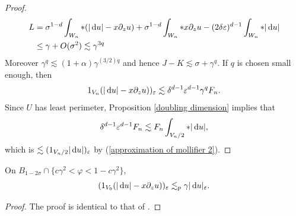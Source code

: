 \begin{proof}
\begin{align*}
L &= \sigma^{1 - d} \int_{W_n} *(|\mathop{}\!\mathrm{d} u| - x\partial_z u) + \sigma^{1 - d} \int_{W_n} *x\partial_z u - (2\delta\varepsilon)^{d - 1} \int_{W_n} *|\mathop{}\!\mathrm{d} u| \\
&\leq \gamma + O(\sigma^2) \lesssim \gamma^{3q}
\end{align*}
Moreover $\gamma^q \lesssim (1 + \alpha)\gamma^{(3/2)q}$ and hence $J - K \lesssim \sigma + \gamma^q$.
If $q$ is chosen small enough, then
\begin{equation}\label{big bound 1}
1_{V_n}(|\mathop{}\!\mathrm{d} u| - x\partial_z u))_\varepsilon \lesssim \delta^{d - 1} \varepsilon^{d - 1} \gamma^q F_n.
\end{equation}
Since $U$ has least perimeter, Proposition \ref{doubling dimension} implies that
$$\delta^{d - 1} \varepsilon^{d - 1} F_n \lesssim F_n \int_{V_n/2} *|\mathop{}\!\mathrm{d} u|,$$
which is $\lesssim (1_{V_n/2}|\mathop{}\!\mathrm{d} u|)_\varepsilon$ by (\ref{approximation of mollifier 2}).
\end{proof}

\begin{sublemma}
On $B_{1 - 2\sigma} \cap \{c\gamma^2 < \varphi < 1 - c\gamma^2\}$,
$$(1_{V_0}(|\mathop{}\!\mathrm{d} u| - x\partial_zu))_\varepsilon \lesssim_p \gamma |\mathop{}\!\mathrm{d} u|_\varepsilon.$$
\end{sublemma}
\begin{proof}
The proof is identical to that of \cite[pg92]{Giusti77}.
\end{proof}


